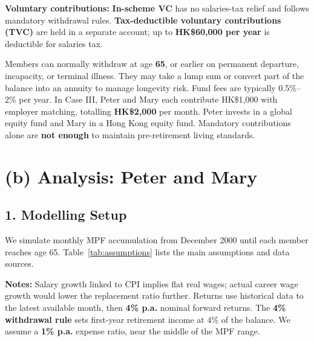\documentclass[12pt, letterpaper]{article}
\begin{document}
\textbf{Voluntary contributions:} \textbf{In-scheme VC} has no salaries-tax relief and follows mandatory withdrawal rules. \textbf{Tax-deductible voluntary contributions (TVC)} are held in a separate account; up to \textbf{HK\$60,000 per year} is deductible for salaries tax.

Members can normally withdraw at age \textbf{65}, or earlier on permanent departure, incapacity, or terminal illness. They may take a lump sum or convert part of the balance into an annuity to manage longevity risk. Fund fees are typically 0.5\%--2\% per year. In Case III, Peter and Mary each contribute HK\$1,000 with employer matching, totalling \textbf{HK\$2,000} per month. Peter invests in a global equity fund and Mary in a Hong Kong equity fund. Mandatory contributions alone are \textbf{not enough} to maintain pre-retirement living standards.

\section*{(b) Analysis: Peter and Mary}

\subsection*{1. Modelling Setup}

We simulate monthly MPF accumulation from December 2000 until each member reaches age 65. Table~\ref{tab:assumptions} lists the main assumptions and data sources.

\textbf{Notes:} Salary growth linked to CPI implies flat real wages; actual career wage growth would lower the replacement ratio further. Returns use historical data to the latest available month, then \textbf{4\% p.a.} nominal forward returns. The \textbf{4\% withdrawal rule} sets first-year retirement income at 4\% of the balance. We assume a \textbf{1\% p.a.} expense ratio, near the middle of the MPF range.
\end{document}
